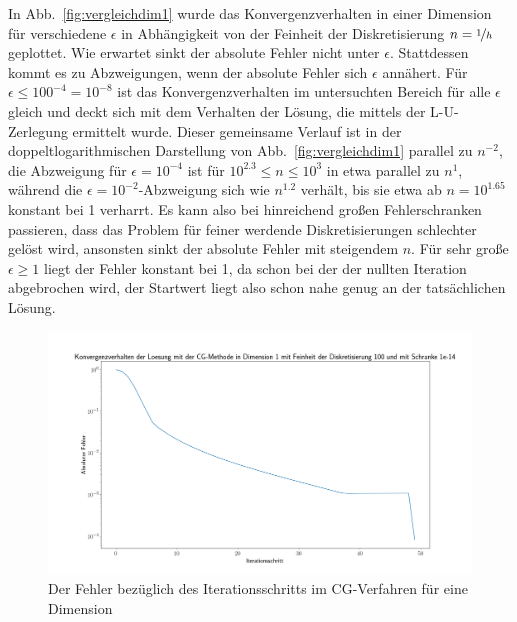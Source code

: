 \documentclass[smallheadings]{scrartcl}
\numberwithin{equation}{section}
\begin{document}
In Abb.~\ref{fig:vergleichdim1} wurde das Konvergenzverhalten in einer Dimension für verschiedene $\epsilon$ in Abhängigkeit von der Feinheit der Diskretisierung $n=\nicefrac{1}{h}$ geplottet. Wie erwartet sinkt der absolute Fehler nicht unter $\epsilon$. Stattdessen kommt es zu \glqq Abzweigungen\grqq, wenn der absolute Fehler sich $\epsilon$ annähert. Für $\epsilon\leq 100^{-4}=10^{-8}$  ist das Konvergenzverhalten im untersuchten Bereich für alle $\epsilon$ gleich und deckt sich mit dem Verhalten der Lösung, die mittels der L-U-Zerlegung ermittelt wurde. Dieser gemeinsame Verlauf ist in der doppeltlogarithmischen Darstellung von Abb.~\ref{fig:vergleichdim1} parallel zu $n^{-2}$, die Abzweigung für $\epsilon=10^{-4}$ ist für $10^{2.3} \leq n\leq 10^{3}$ in etwa parallel zu  $n^{1}$, während die $\epsilon=10^{-2}$-Abzweigung sich wie $n^{1.2}$ verhält, bis sie etwa ab $n=10^{1.65}$ konstant bei 1 verharrt. Es kann also bei hinreichend großen Fehlerschranken passieren, dass das Problem für feiner werdende Diskretisierungen schlechter gelöst wird, ansonsten sinkt der absolute Fehler mit steigendem $n$. Für sehr große $\epsilon \geq 1$ liegt der Fehler konstant bei 1, da schon bei der der nullten Iteration abgebrochen wird, der Startwert liegt also schon nahe genug an der tatsächlichen Lösung. 


\begin{figure}[H]
	\centering
	\includegraphics[width=\linewidth]{Bilder/IterDim1}
	\caption{Der Fehler bezüglich des Iterationsschritts im CG-Verfahren für eine Dimension}
	\label{fig:iterdim1}
\end{figure}
\end{document}
